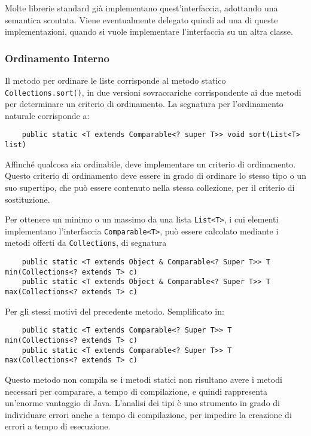 \documentclass{article}
\numberwithin{equation}{subsection}
\begin{document}
Molte librerie standard già implementano quest'interfaccia, adottando una semantica scontata. Viene eventualmente delegato quindi ad una di queste implementazioni, quando si vuole 
implementare l'interfaccia su un altra classe. 

\subsubsection{Ordinamento Interno}

Il metodo per ordinare le liste corrisponde al metodo statico \verb|Collections.sort()|, in due versioni sovraccariche corrispondente ai due metodi per determinare un 
criterio di ordinamento. La segnatura per l'ordinamento naturale corrisponde a:
\begin{verbatim}
    public static <T extends Comparable<? super T>> void sort(List<T> list)
\end{verbatim}
Affinché qualcosa sia ordinabile, deve implementare un criterio di ordinamento. Questo criterio di ordinamento deve essere in grado di ordinare lo stesso tipo o un suo supertipo, che 
può essere contenuto nella stessa collezione, per il criterio di sostituzione.  

Per ottenere un minimo o un massimo da una lista \verb|List<T>|, i cui elementi implementano l'interfaccia \verb|Comparable<T>|, può essere calcolato mediante i metodi offerti 
da \verb|Collections|, di segnatura
\begin{verbatim}
    public static <T extends Object & Comparable<? Super T>> T min(Collections<? extends T> c)
    public static <T extends Object & Comparable<? Super T>> T max(Collections<? extends T> c)
\end{verbatim}
Per gli stessi motivi del precedente metodo. Semplificato in:
\begin{verbatim}
    public static <T extends Comparable<? Super T>> T min(Collections<? extends T> c)
    public static <T extends Comparable<? Super T>> T max(Collections<? extends T> c)
\end{verbatim}
Questo metodo non compila se i metodi statici non risultano avere i metodi necessari per comparare, a tempo di compilazione, e quindi rappresenta un'enorme vantaggio 
di Java. L'analisi dei tipi è uno strumento in grado di individuare errori anche a tempo di compilazione, per impedire la creazione di errori a tempo di esecuzione. 
\end{document}
